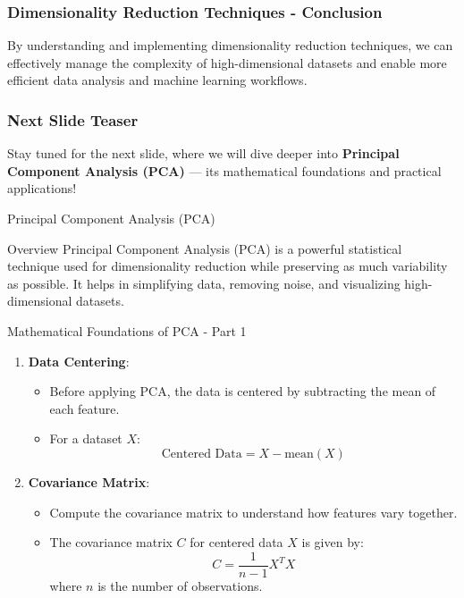 \documentclass[aspectratio=169]{beamer}
\begin{document}
\begin{frame}[fragile]
    \frametitle{Dimensionality Reduction Techniques - Conclusion}
    By understanding and implementing dimensionality reduction techniques, 
    we can effectively manage the complexity of high-dimensional datasets and 
    enable more efficient data analysis and machine learning workflows.
\end{frame}

\begin{frame}[fragile]
    \frametitle{Next Slide Teaser}
    Stay tuned for the next slide, where we will dive deeper into \textbf{Principal Component Analysis (PCA)} — its mathematical foundations and practical applications!
\end{frame}

\begin{frame}[fragile]{Principal Component Analysis (PCA)}
    \begin{block}{Overview}
        Principal Component Analysis (PCA) is a powerful statistical technique used for dimensionality reduction while preserving as much variability as possible. 
        It helps in simplifying data, removing noise, and visualizing high-dimensional datasets.
    \end{block}
\end{frame}

\begin{frame}[fragile]{Mathematical Foundations of PCA - Part 1}
    \begin{enumerate}
        \item \textbf{Data Centering}: 
        \begin{itemize}
            \item Before applying PCA, the data is centered by subtracting the mean of each feature.
            \item For a dataset \( X \):
            \begin{equation}
                \text{Centered Data} = X - \text{mean}(X)
            \end{equation}
        \end{itemize}
        
        \item \textbf{Covariance Matrix}:
        \begin{itemize}
            \item Compute the covariance matrix to understand how features vary together.
            \item The covariance matrix \( C \) for centered data \( X \) is given by:
            \begin{equation}
                C = \frac{1}{n-1} X^T X
            \end{equation}
            where \( n \) is the number of observations.
        \end{itemize}
    \end{enumerate}
\end{frame}
\end{document}
